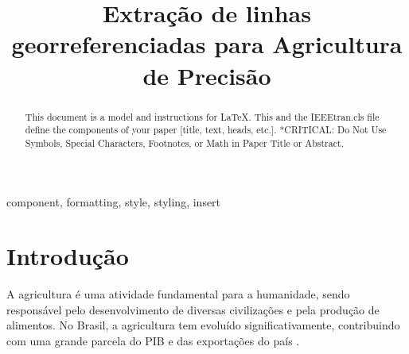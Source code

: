 \documentclass[conference]{IEEEtran}
\begin{document}
\title{Extração de linhas georreferenciadas para Agricultura de Precisão\\
 }

\author{
\and
{}
\and
{}
}


\maketitle

\begin{abstract}
This document is a model and instructions for \LaTeX.
This and the IEEEtran.cls file define the components of your paper [title, text, heads, etc.]. *CRITICAL: Do Not Use Symbols, Special Characters, Footnotes, 
or Math in Paper Title or Abstract.
\end{abstract}

\begin{IEEEkeywords}
component, formatting, style, styling, insert
\end{IEEEkeywords}

\section{Introdução}

A agricultura é uma atividade fundamental para a humanidade, 
sendo responsável pelo desenvolvimento de diversas civilizações e pela produção de alimentos. 
No Brasil, a agricultura tem evoluído significativamente, contribuindo com uma grande parcela do PIB e 
das exportações do país \cite{embrapa2023}.
\end{document}
